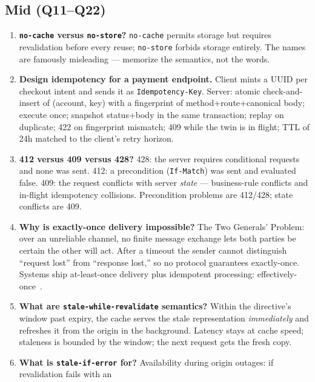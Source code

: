 \subsection*{Mid (Q11--Q22)}
\begin{enumerate}[label=\textbf{Q\arabic*.}, leftmargin=1.6cm, start=11]
  \item \textbf{\texttt{no-cache} versus \texttt{no-store}?}
        \texttt{no-cache} permits storage but requires revalidation before
        every reuse; \texttt{no-store} forbids storage entirely. The names
        are famously misleading --- memorize the semantics, not the words.
  \item \textbf{Design idempotency for a payment endpoint.}
        Client mints a UUID per checkout intent and sends it as
        \texttt{Idempotency-Key}. Server: atomic check-and-insert of
        (account, key) with a fingerprint of method+route+canonical body;
        execute once; snapshot status+body in the same transaction; replay
        on duplicate; 422 on fingerprint mismatch; 409 while the twin is in
        flight; TTL of 24h matched to the client's retry horizon.
  \item \textbf{412 versus 409 versus 428?}
        428: the server requires conditional requests and none was sent.
        412: a precondition (\texttt{If-Match}) was sent and evaluated
        false. 409: the request conflicts with server \emph{state} ---
        business-rule conflicts and in-flight idempotency collisions.
        Precondition problems are 412/428; state conflicts are 409.
  \item \textbf{Why is exactly-once delivery impossible?}
        The Two Generals' Problem: over an unreliable channel, no finite
        message exchange lets both parties be certain the other will act.
        After a timeout the sender cannot distinguish ``request lost'' from
        ``response lost,'' so no protocol guarantees exactly-once. Systems
        ship at-least-once delivery plus idempotent processing:
        effectively-once~\cite{kleppmann2017ddia}.
  \item \textbf{What are \texttt{stale-while-revalidate} semantics?}
        Within the directive's window past expiry, the cache serves the
        stale representation \emph{immediately} and refreshes it from the
        origin in the background. Latency stays at cache speed; staleness
        is bounded by the window; the next request gets the fresh copy.
  \item \textbf{What is \texttt{stale-if-error} for?}
        Availability during origin outages: if revalidation fails with an

\end{enumerate}
